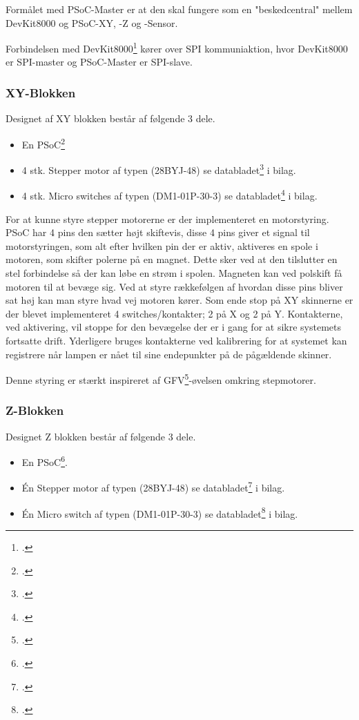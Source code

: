 Formålet med PSoC-Master er at den skal fungere som en "beskedcentral" mellem DevKit8000 og PSoC-XY, -Z og -Sensor.

Forbindelsen med DevKit8000\footcite{dk8000-addon} kører over SPI kommuniaktion, hvor DevKit8000 er SPI-master og PSoC-Master er SPI-slave.


\subsubsection{XY-Blokken}

Designet af XY blokken består af følgende 3 dele.

\begin{itemize}
    \item En PSoC\footcite{psoc}
    \item 4 stk. Stepper motor af typen (28BYJ-48) se databladet\footcite{28BYJ-48-5V} i bilag.
    \item 4 stk. Micro switches af typen (DM1-01P-30-3) se databladet\footcite{DM1-01P-30-3} i bilag.
\end{itemize}

For at kunne styre stepper motorerne er der implementeret en motorstyring. PSoC har 4 pins den sætter højt skiftevis, disse 4 pins giver et signal til motorstyringen, som alt efter hvilken pin der er aktiv, aktiveres en spole i motoren, som skifter polerne på en magnet. Dette sker ved at den tilslutter en stel forbindelse så der kan løbe en strøm i spolen. Magneten kan ved polskift få motoren til at bevæge sig. Ved at styre rækkefølgen af hvordan disse pins bliver sat høj kan man styre hvad vej motoren kører. Som ende stop på XY skinnerne er der blevet implementeret 4 switches/kontakter; 2 på X og 2 på Y. Kontakterne, ved aktivering, vil stoppe for den bevægelse der er i gang for at sikre systemets fortsatte drift. Yderligere bruges kontakterne ved kalibrering for at systemet kan registrere når lampen er nået til sine endepunkter på de pågældende skinner. 

Denne styring er stærkt inspireret af GFV\footcite{gfv}-øvelsen omkring stepmotorer.

\subsubsection{Z-Blokken}

Designet Z blokken består af følgende 3 dele.

\begin{itemize}
	\item En PSoC\footcite{psoc}.
	\item Én Stepper motor af typen (28BYJ-48) se databladet\footcite{28BYJ-48-5V} i bilag.
	\item Én Micro switch af typen (DM1-01P-30-3) se databladet\footcite{DM1-01P-30-3} i bilag.
\end{itemize}

